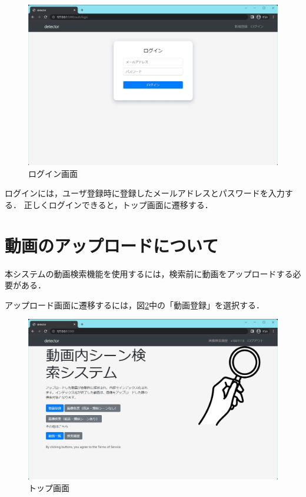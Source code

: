 \documentclass[a4j,12pt,dvipdfmx]{jreport}
\begin{document}
\begin{figure}[H]
  \centering
  \includegraphics[width=13cm]{image/user_login.jpg}
  \caption{ログイン画面}
  \label{fig:user_login}
\end{figure}

ログインには，ユーザ登録時に登録したメールアドレスとパスワードを入力する．
正しくログインできると，トップ画面に遷移する．

\section{動画のアップロードについて}
本システムの動画検索機能を使用するには，検索前に動画をアップロードする必要がある．

アップロード画面に遷移するには，図\ref{fig:index}中の「動画登録」を選択する．

\begin{figure}[H]
  \centering
  \includegraphics[width=13cm]{image/index.jpg}
  \caption{トップ画面}
  \label{fig:index}
\end{figure}
\end{document}
